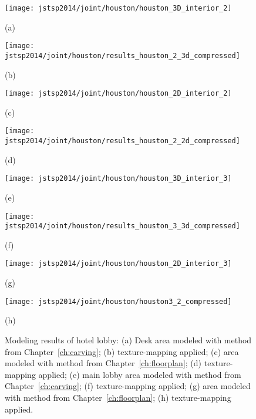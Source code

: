 \documentclass[12pt,onecolumn,oneside]{book}
\begin{document}
\begin{figure}

	\begin{minipage}[t]{0.48\linewidth}
		\centerline{\texttt{[image: jstsp2014/joint/houston/houston\_3D\_interior\_2]}}
		\centerline{(a)}\medskip
	\end{minipage}
	\hfill
	\begin{minipage}[t]{0.48\linewidth}
		\centerline{\texttt{[image: jstsp2014/joint/houston/results\_houston\_2\_3d\_compressed]}}
		\centerline{(b)}\medskip
	\end{minipage}
	\hfill
	\begin{minipage}[t]{0.48\linewidth}
		\centerline{\texttt{[image: jstsp2014/joint/houston/houston\_2D\_interior\_2]}}
		\centerline{(c)}\medskip
	\end{minipage}
	\hfill
	\begin{minipage}[t]{0.48\linewidth}
		\centerline{\texttt{[image: jstsp2014/joint/houston/results\_houston\_2\_2d\_compressed]}}
		\centerline{(d)}\medskip
	\end{minipage}
	
	\begin{minipage}[t]{0.48\linewidth}
		\centerline{\texttt{[image: jstsp2014/joint/houston/houston\_3D\_interior\_3]}}
		\centerline{(e)}\medskip
	\end{minipage}
	\hfill
	\begin{minipage}[t]{0.48\linewidth}
		\centerline{\texttt{[image: jstsp2014/joint/houston/results\_houston\_3\_3d\_compressed]}}
		\centerline{(f)}\medskip
	\end{minipage}
	\hfill
	\begin{minipage}[t]{0.48\linewidth}
		\centerline{\texttt{[image: jstsp2014/joint/houston/houston\_2D\_interior\_3]}}
		\centerline{(g)}\medskip
	\end{minipage}
	\hfill
	\begin{minipage}[t]{0.48\linewidth}
		\centerline{\texttt{[image: jstsp2014/joint/houston/houston3\_2\_compressed]}}
		\centerline{(h)}\medskip
	\end{minipage}

	\caption[Comparison of modeling results of a hotel lobby.]{Modeling results of hotel lobby: (a) Desk area modeled with method from Chapter~\ref{ch:carving}; (b) texture-mapping applied; (c) area modeled with method from Chapter~\ref{ch:floorplan}; (d) texture-mapping applied; (e) main lobby area modeled with method from Chapter~\ref{ch:carving}; (f) texture-mapping applied; (g) area modeled with method from Chapter~\ref{ch:floorplan}; (h) texture-mapping applied.}
	\label{fig:comparison_houston}

\end{figure}
\end{document}
